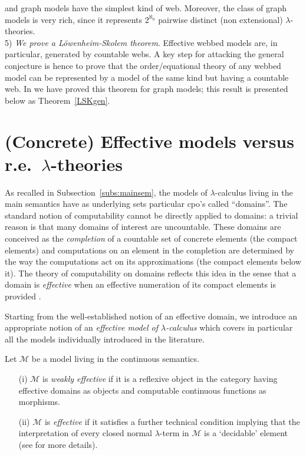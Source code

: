 \documentclass[english]{llncs}
\newcommand{\lm}[1]{\mathscr{#1}} \newcommand{\Lint}[1]{\Lbrack #1\Rbrack} \newcommand{\ca}[1]{\mathscr{#1}} \newcommand{\Int}[1]{\vert #1\vert}
\begin{document}
and graph models have the simplest kind of web.
Moreover, the class of graph models is very rich, since it represents $2^{\aleph_{0}}$ pairwise distinct (non extensional) $\lambda$-theories. \\
5) \emph{We prove a L\"owenheim-Skolem theorem}. 
Effective webbed models are, in particular, generated by countable webs. 
A key step for attacking the general conjecture is hence to prove that the order/equational theory of any webbed model 
can be represented by a model of the same kind but having a countable web. 
In \cite[Chapter~5]{ManzonettoTh} we have proved this theorem for graph models; this result is presented below as Theorem~\ref{LSKgen}.

\section{(Concrete) Effective models versus r.e.\ $\lambda$-theories}\label{sec:(Concrete) Effective models}


As recalled in Subsection~\ref{subs:mainsem}, the models of $\lambda$-calculus living in the main semantics have as underlying sets particular 
cpo's called ``domains''.
The standard notion of computability cannot be directly applied to domains: a trivial reason is that many domains of interest are uncountable.
These domains are conceived as the {\em completion} of a countable set of concrete elements (the compact elements) and computations
on an element in the completion are determined by the way the computations act on its approximations (the compact elements below it).
The theory of computability on domains reflects this idea in the sense that a domain is \emph{effective} when an effective numeration of its 
compact elements is provided \cite[Ch~10, Def.~3.1]{Viggo94}.

Starting from the well-established notion of an effective domain, we introduce an appropriate notion of an {\em effective model of $\lambda$-calculus}
which covers in particular all the models individually introduced in the literature.

\begin{definition} Let $\lm{M}$ be a model living in the continuous semantics.
\begin{itemize}
\item[(i)] $\lm{M}$ is {\em weakly effective} if it is a reflexive object in the category having effective domains as objects and 
computable continuous functions as morphisms. 
\item[(ii)] $\lm{M}$ is {\em effective} if it satisfies a further technical condition implying that the interpretation of every
closed normal $\lambda$-term in $\lm{M}$ is a `decidable' element (see \cite[Def.~6.2.45]{ManzonettoTh} for more details).
\end{itemize}
\end{definition}
\end{document}
